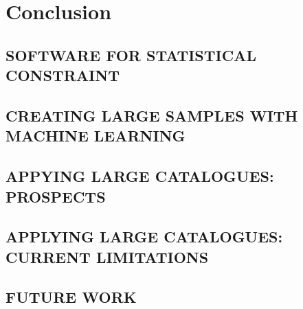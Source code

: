\chapter{Conclusion}
\section{SOFTWARE FOR STATISTICAL CONSTRAINT}
\section{CREATING LARGE SAMPLES WITH MACHINE LEARNING}
\section{APPYING LARGE CATALOGUES: PROSPECTS}
\section{APPLYING LARGE CATALOGUES: CURRENT LIMITATIONS}
\section{FUTURE WORK}